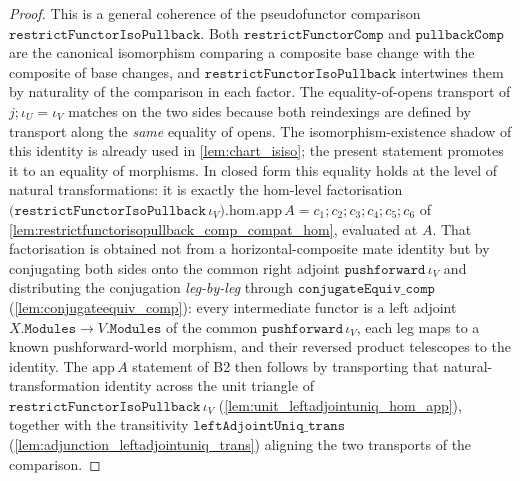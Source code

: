 \begin{proof}
  This is a general coherence of the pseudofunctor comparison
  \(\mathtt{restrictFunctorIsoPullback}\). Both \(\mathtt{restrictFunctorComp}\) and
  \(\mathtt{pullbackComp}\) are the canonical isomorphism comparing a composite base change with the
  composite of base changes, and \(\mathtt{restrictFunctorIsoPullback}\) intertwines them by
  naturality of the comparison in each factor. The equality-of-opens transport of
  \(j \mathbin{;} \iota_U = \iota_V\) matches on the two sides because both reindexings are defined by
  transport along the \emph{same} equality of opens. The isomorphism-existence shadow of this
  identity is already used in \cref{lem:chart_isiso}; the present statement promotes it to an
  equality of morphisms. In closed form this equality holds at the level of natural transformations:
  it is exactly the hom-level factorisation
  \(\bigl(\mathtt{restrictFunctorIsoPullback}\,\iota_V\bigr).\mathrm{hom}.\mathrm{app}\,A
  = c_1 \mathbin{;} c_2 \mathbin{;} c_3 \mathbin{;} c_4 \mathbin{;} c_5 \mathbin{;} c_6\) of
  \cref{lem:restrictfunctorisopullback_comp_compat_hom}, evaluated at \(A\). That factorisation is
  obtained not from a horizontal-composite mate identity but by conjugating both sides onto the
  common right adjoint \(\mathtt{pushforward}\,\iota_V\) and distributing the conjugation
  \emph{leg-by-leg} through \(\mathtt{conjugateEquiv\_comp}\) (\cref{lem:conjugateequiv_comp}): every
  intermediate functor is a left adjoint \(X.\mathtt{Modules} \to V.\mathtt{Modules}\) of the common
  \(\mathtt{pushforward}\,\iota_V\), each leg maps to a known pushforward-world morphism, and their
  reversed product telescopes to the identity. The \(\mathrm{app}\,A\) statement of B2 then follows
  by transporting that natural-transformation identity across the unit triangle of
  \(\mathtt{restrictFunctorIsoPullback}\,\iota_V\) (\cref{lem:unit_leftadjointuniq_hom_app}),
  together with the transitivity \(\mathtt{leftAdjointUniq\_trans}\)
  (\cref{lem:adjunction_leftadjointuniq_trans}) aligning the two transports of the comparison.
\end{proof}

